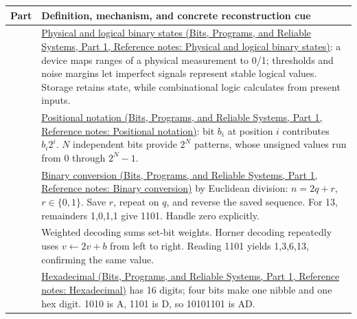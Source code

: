 {\def\LTcaptype{none} %
\begin{longtable}[]{@{}
  >{\raggedright\arraybackslash}p{}
  >{\raggedright\arraybackslash}p{}@{}}
\toprule\noalign{}
\begin{minipage}[b]{\linewidth}\raggedright
Part
\end{minipage} & \begin{minipage}[b]{\linewidth}\raggedright
Definition, mechanism, and concrete reconstruction cue
\end{minipage} \\
\midrule\noalign{}
\endhead
\bottomrule\noalign{}
\endlastfoot
1 & \href{../01-Bits-Programs-and-Reliable-Systems-P01/main.pdf\#nameddest=appendix-ea798b1ceb35}{Physical and logical binary states (Bits, Programs, and Reliable Systems, Part 1, Reference notes: Physical and logical binary states)}: a device maps ranges of a physical measurement to 0/1; thresholds and noise margins let imperfect signals represent stable logical values. Storage retains state, while combinational logic calculates from present inputs. \\
2 & \href{../01-Bits-Programs-and-Reliable-Systems-P01/main.pdf\#nameddest=appendix-83c3f28f7bda}{Positional notation (Bits, Programs, and Reliable Systems, Part 1, Reference notes: Positional notation)}: bit \(b_i\) at position \(i\) contributes \(b_i2^i\). \(N\) independent bits provide \(2^N\) patterns, whose unsigned values run from 0 through \(2^N-1\). \\
3 & \href{../01-Bits-Programs-and-Reliable-Systems-P01/main.pdf\#nameddest=appendix-dc552784a2c0}{Binary conversion (Bits, Programs, and Reliable Systems, Part 1, Reference notes: Binary conversion)} by Euclidean division: \(n=2q+r\), \(r\in\{0,1\}\). Save \(r\), repeat on \(q\), and reverse the saved sequence. For 13, remainders 1,0,1,1 give 1101. Handle zero explicitly. \\
4 & Weighted decoding sums set-bit weights. Horner decoding repeatedly uses \(v\leftarrow2v+b\) from left to right. Reading 1101 yields 1,3,6,13, confirming the same value. \\
5 & \href{../01-Bits-Programs-and-Reliable-Systems-P01/main.pdf\#nameddest=appendix-6b8075763724}{Hexadecimal (Bits, Programs, and Reliable Systems, Part 1, Reference notes: Hexadecimal)} has 16 digits; four bits make one nibble and one hex digit. 1010 is A, 1101 is D, so 10101101 is AD. \\

\end{longtable}}
